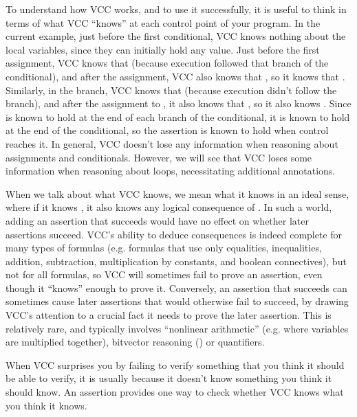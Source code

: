 To understand how VCC works, and to use it successfully, it is useful to
think in terms of what VCC ``knows'' at each control point
of your program. In the current example, just before the first conditional,
VCC  knows nothing about the local variables,
since they can initially hold any value. 
Just before the first assignment, VCC knows that 
 (because execution followed that branch of the conditional), and
after the assignment, VCC also knows that , 
so it knows that . Similarly, in the  branch,
VCC knows that  (because execution didn't follow the
 branch), and after the assignment to , it also knows
that , so it also knows . Since 
 is known to hold at the end of each branch of the
conditional, it is known to hold at the end of the conditional, so the
assertion is known to hold when control reaches it.
In general,
VCC doesn't lose any information when reasoning about assignments and
conditionals. However, we will see that VCC
loses some information when reasoning about loops,
necessitating additional annotations.

When we talk about what VCC knows, we mean what it knows in an ideal
sense, where if it knows , it also knows any logical
consequence of . In such a world, adding an assertion that
succeeds would have no effect on whether later assertions succeed.
VCC's ability to deduce consequences is indeed complete for many types
of formulas (e.g. formulas that use only equalities,
inequalities, addition, subtraction, multiplication by constants, and
boolean connectives), but not for all formulas, so VCC will
sometimes fail to prove an assertion, even though it ``knows'' enough
to prove it.  Conversely, an assertion that succeeds can sometimes cause later assertions that
would otherwise fail to succeed, by drawing VCC's attention to a
crucial fact it needs to prove the later assertion.  This is
relatively rare, and typically involves ``nonlinear arithmetic''
(e.g. where variables are multiplied together), bitvector reasoning
() or quantifiers.

When VCC surprises you by failing to verify something that you think
it should be able to verify, it is usually because it doesn't know
something you think it should know. An assertion provides one way to
check whether VCC knows what you think it knows.

%

